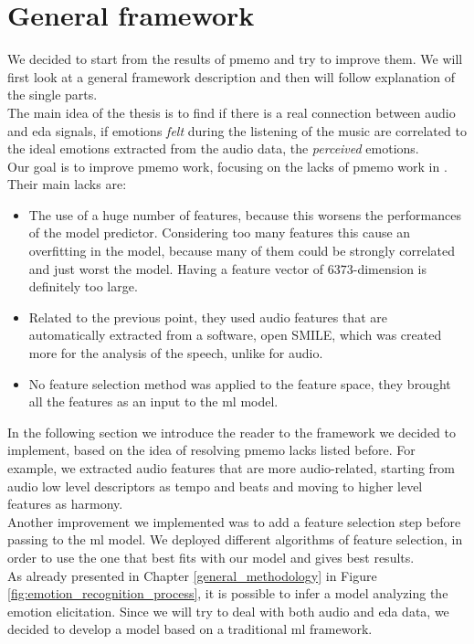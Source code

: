 \section{General framework}
We decided to start from the results of \gls{pmemo} and try to improve them. We will first look at a general framework description and then will follow explanation of the single parts.
\\
The main idea of the thesis is to find if there is a real connection between audio and \gls{eda} signals, if emotions \textit{felt} during the listening of the music are correlated to the ideal emotions extracted from the audio data, the \textit{perceived} emotions.
\\
Our goal is to improve \gls{pmemo} work, focusing on the lacks of \gls{pmemo} work in \cite{zhang2018pmemo}. Their main lacks are:
\begin{itemize}
	\item The use of a huge number of features, because this worsens the performances of the model predictor. Considering too many features this cause an overfitting in the model, because many of them could be strongly correlated and just worst the model. Having a feature vector of $6373$-dimension is definitely too large.
	\item Related to the previous point, they used audio features that are automatically extracted from a software, open SMILE, which was created more for the analysis of the speech, unlike for audio.
	\item No feature selection method was applied to the feature space, they brought all the features as an input to the \gls{ml} model.
\end{itemize}
In the following section we introduce the reader to the framework we decided to implement, based on the idea of resolving \gls{pmemo} lacks listed before. For example, we extracted audio features that are more audio-related, starting from audio low level descriptors as tempo and beats and moving to higher level features as harmony.
\\
Another improvement we implemented was to add a feature selection step before passing to the \gls{ml} model. We deployed different algorithms of feature selection, in order to use the one that best fits with our model and gives best results.
\\ \indent
As already presented in Chapter \ref{general_methodology} in Figure \ref{fig:emotion_recognition_process}, it is possible to infer a model analyzing the emotion elicitation. Since we will try to deal with both audio and \gls{eda} data, we decided to develop a model based on a traditional \gls{ml} framework.
